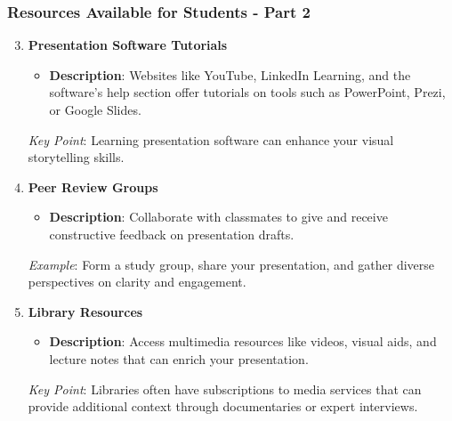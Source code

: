 \documentclass[aspectratio=169]{beamer}
\begin{document}
\begin{frame}[fragile]
    \frametitle{Resources Available for Students - Part 2}
    \begin{enumerate}
        \setcounter{enumi}{2} %
        \item \textbf{Presentation Software Tutorials}
        \begin{itemize}
            \item \textbf{Description}: Websites like YouTube, LinkedIn Learning, and the software’s help section offer tutorials on tools such as PowerPoint, Prezi, or Google Slides.
        \end{itemize}
        \pause
        \textit{Key Point}: Learning presentation software can enhance your visual storytelling skills.

        \item \textbf{Peer Review Groups}
        \begin{itemize}
            \item \textbf{Description}: Collaborate with classmates to give and receive constructive feedback on presentation drafts.
        \end{itemize}
        \pause
        \textit{Example}: Form a study group, share your presentation, and gather diverse perspectives on clarity and engagement.

        \item \textbf{Library Resources}
        \begin{itemize}
            \item \textbf{Description}: Access multimedia resources like videos, visual aids, and lecture notes that can enrich your presentation.
        \end{itemize}
        \pause
        \textit{Key Point}: Libraries often have subscriptions to media services that can provide additional context through documentaries or expert interviews.
    \end{enumerate}
\end{frame}
\end{document}
